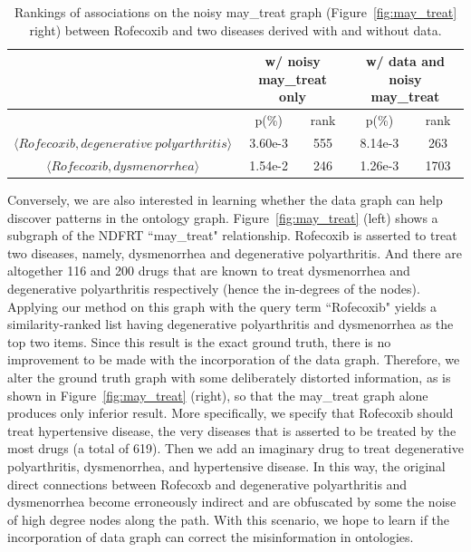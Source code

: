 \begin{table}[tbh]\scriptsize
\begin{center}
\begin{tabular}{ c | c  c | c  c }
\hline
        &   \multicolumn{2}{c|}{w/ noisy may\_treat only}    &   \multicolumn{2}{c}{w/ data and noisy may\_treat}\\
\hline
       	&   p(\%)   &   rank    &  p(\%)    &    rank    \\
\hline
$\langle Rofecoxib, degenerative~polyarthritis\rangle$       &   3.60e-3   &   555     &   8.14e-3    &   263    \\
$\langle Rofecoxib, dysmenorrhea\rangle$    &   1.54e-2   &   246     &   1.26e-3    &   1703   \\
\hline
\end{tabular}
\end{center}
\caption[Rankings of associations on the noisy may\_treat graph]{\label{tbl:salted_may_treat}Rankings of associations on the noisy may\_treat graph (Figure~\ref{fig:may_treat} right) between Rofecoxib and two diseases derived with and without data.}
\end{table}

Conversely, we are also interested in learning whether the data graph can help discover patterns in the ontology graph. Figure~\ref{fig:may_treat} (left) shows a subgraph of the NDFRT ``may\_treat" relationship. Rofecoxib is asserted to treat two diseases, namely, dysmenorrhea and degenerative polyarthritis. And there are altogether 116 and 200 drugs that are known to treat dysmenorrhea and degenerative polyarthritis respectively (hence the in-degrees of the nodes). Applying our method on this graph with the query term ``Rofecoxib" yields a similarity-ranked list having degenerative polyarthritis and dysmenorrhea as the top two items. Since this result is the exact ground truth, there is no improvement to be made with the incorporation of the data graph. Therefore, we alter the ground truth graph with some deliberately distorted information, as is shown in Figure~\ref{fig:may_treat} (right), so that the may\_treat graph alone produces only inferior result. More specifically, we specify that Rofecoxib should treat hypertensive disease, the very diseases that is asserted to be treated by the most drugs (a total of 619). Then we add an imaginary drug to treat degenerative polyarthritis, dysmenorrhea, and hypertensive disease. In this way, the original direct connections between Rofecoxb and degenerative polyarthritis and dysmenorrhea become erroneously indirect and are obfuscated by some the noise of high degree nodes along the path. With this scenario, we hope to learn if the incorporation of data graph can correct the misinformation in ontologies.

